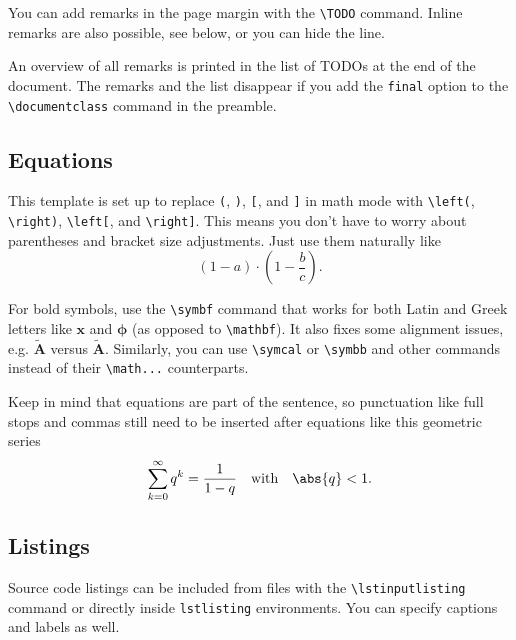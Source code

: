 You can add remarks in the page margin with the \texttt{\textbackslash TODO} command. Inline remarks are also possible, see below, or you can hide the line.

An overview of all remarks is printed in the list of TODOs at the end of the document. The remarks and the list disappear if you add the \texttt{final} option to the \texttt{\textbackslash documentclass} command in the preamble.

\subsection{Equations}
\label{equations}

This template is set up to replace \texttt{(}, \texttt{)}, \texttt{[}, and \texttt{]} in math mode with \texttt{\textbackslash left(}, \texttt{\textbackslash right)}, \texttt{\textbackslash left[}, and \texttt{\textbackslash right]}. This means you don't have to worry about parentheses and bracket size adjustments. Just use them naturally like
\begin{equation}
  \label{eq:label}
  (1 - a) \cdot (1 - \frac{b}{c})
  \text{.}
\end{equation}

For bold symbols, use the \texttt{\textbackslash symbf} command that works for both Latin and Greek letters like $\symbf{x}$ and $\symbf{\phi}$ (as opposed to \texttt{\textbackslash mathbf}). It also fixes some alignment issues, e.g. $\tilde{\symbf{A}}$ versus $\tilde{\mathbf{A}}$. Similarly, you can use \texttt{\textbackslash symcal} or \texttt{\textbackslash symbb} and other commands instead of their \texttt{\textbackslash math...} counterparts.

Keep in mind that equations are part of the sentence, so punctuation like full stops and commas still need to be inserted after equations like this geometric series
\begin{equation}
  \label{eq:label2}
  \sum_{k=0}^\infty q^k = \frac{1}{1-q}
  \quad\text{with}\quad
  \abs{q} < 1
  \text{.}
\end{equation}

\subsection{Listings}
\label{sec:listings}

Source code listings can be included from files with the \texttt{\textbackslash lstinputlisting} command or directly inside \texttt{lstlisting} environments. You can specify captions and labels as well.

